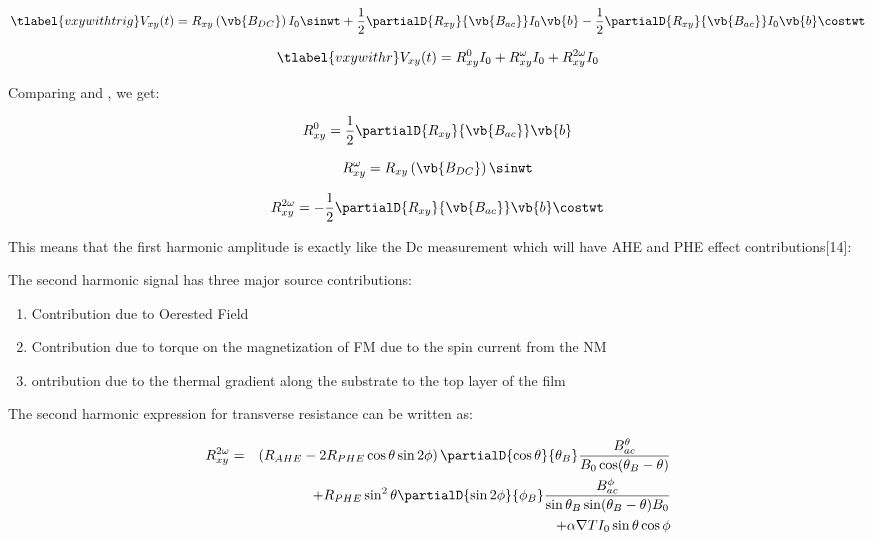 \begin{equation}
    \tlabel{vxywithtrig}
    V_{xy}(t) = R_{xy} \left( \vb{B_{DC}} \right) I_{0} \sinwt + 
    \frac{1}{2} \partialD{R_{xy}}{\vb{B_{ac}}} I_{0} \vb{b}  - 
    \frac{1}{2} \partialD{R_{xy}}{\vb{B_{ac}}} I_{0} \vb{b} \costwt
\end{equation}

\begin{equation}
    \tlabel{vxywithr}
    V_{xy}(t) = R^{0}_{xy} I_{0} + R^{\omega}_{xy} I_{0} + R^{2 \omega}_{xy} I_{0}
\end{equation}

Comparing  and , we get:

\begin{equation}
    R^{0}_{xy} = \frac{1}{2} \partialD{R_{xy}}{\vb{B_{ac}}} \vb{b} 
\end{equation}

\begin{equation}
    R^{\omega}_{xy} = R_{xy} \left( \vb{B_{DC}} \right)  \sinwt 
\end{equation}

\begin{equation}
    R^{2 \omega}_{xy}  = - \frac{1}{2} \partialD{R_{xy}}{\vb{B_{ac}}} \vb{b} \costwt
\end{equation}

This means that the first harmonic amplitude is exactly like the Dc measurement which 
will have AHE and PHE effect contributions[14]:

The second harmonic signal has three major source contributions:

\begin{enumerate}
    \item Contribution due to Oerested Field
    \item Contribution due to torque on  the magnetization of FM due to the spin current 
    from the NM
    \item ontribution due to the thermal gradient along the substrate to the top layer of
     the film
\end{enumerate}

The second harmonic expression for transverse resistance can be written as:

\begin{eqnarray} \nonumber
        R^{2 \omega}_{xy}  &=& \left( R_{AHE} - 2 R_{PHE} \cos{\theta} \sin{2 \phi} \right)
        \partialD{\cos{\theta}}{\theta_{B}} \frac{B^{\theta}_{ac}}{B_{0} \cos ({\theta_{B} - \theta})} \\
        && \nonumber + R_{PHE} \sin ^{2} {\theta} \partialD{\sin {2\phi}}{\phi_{B}} 
        \frac{B^{\phi}_{ac}}{\sin {\theta_{B}}  \sin ({\theta_{B} - \theta}) B_{0}} \\
        && + \alpha \nabla {T} I_{0} \sin{\theta}\cos{\phi}
\end{eqnarray}

